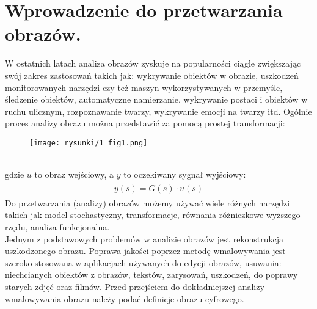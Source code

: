 \documentclass[a4paper,12pt,twoside,openany]{report}
\begin{document}
\section{Wprowadzenie do przetwarzania obrazów.}
W ostatnich latach analiza obrazów zyskuje na popularności ciągle zwiększając swój zakres zastosowań takich jak: wykrywanie obiektów w obrazie, uszkodzeń monitorowanych narzędzi czy też maszyn wykorzystywanych w przemyśle, śledzenie obiektów, automatyczne namierzanie, wykrywanie postaci i obiektów w ruchu ulicznym, rozpoznawanie twarzy, wykrywanie emocji na twarzy itd.  Ogólnie proces analizy obrazu można przedstawić za pomocą prostej transformacji: \\
\begin{figure}[!h]
	\centering
	\texttt{[image: rysunki/1\_fig1.png]}
\end{figure}
\\
gdzie $u$ to obraz wejściowy, a $y$ to oczekiwany sygnał wyjściowy:
\begin{align}
\begin{aligned}
y(s) = G(s) \cdot u(s)
\end{aligned}
\end{align}
Do przetwarzania (analizy) obrazów możemy używać wiele różnych narzędzi takich jak model stochastyczny, transformacje, równania różniczkowe wyższego rzędu, analiza funkcjonalna. \\
Jednym z podstawowych problemów w analizie obrazów jest rekonstrukcja uszkodzonego obrazu. Poprawa jakości poprzez metodę wmalowywania jest szeroko stosowana w aplikacjach używanych do edycji obrazów, usuwania: niechcianych obiektów z obrazów, tekstów, zarysowań, uszkodzeń, do poprawy starych zdjęć oraz filmów. Przed przejściem do dokładniejszej analizy wmalowywania obrazu należy podać definicje obrazu cyfrowego.
\end{document}
